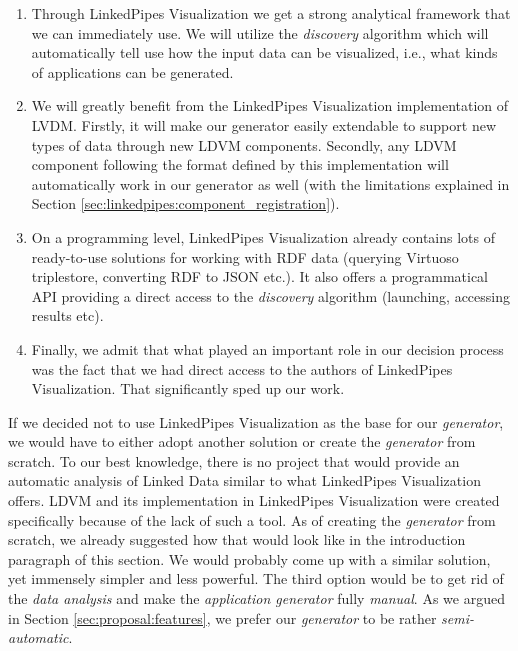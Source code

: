 \begin{enumerate}
\item Through LinkedPipes Visualization we get a strong analytical framework that we can immediately use. We will utilize the \emph{discovery} algorithm which will automatically tell use how the input data can be visualized, i.e., what kinds of applications can be generated.
\item We will greatly benefit from the LinkedPipes Visualization implementation of LVDM. Firstly, it will make our generator easily extendable to support new types of data through new LDVM components. Secondly, any LDVM component following the format defined by this implementation will automatically work in our generator as well (with the limitations explained in Section \ref{sec:linkedpipes:component_registration}).
\item On a programming level, LinkedPipes Visualization already contains lots of ready-to-use solutions for working with RDF data (querying Virtuoso triplestore, converting RDF to JSON etc.). It also offers a programmatical API providing a direct access to the \emph{discovery} algorithm (launching, accessing results etc).
\item Finally, we admit that what played an important role in our decision process was the fact that we had direct access to the authors of LinkedPipes Visualization. That significantly sped up our work.

\end{enumerate}
If we decided not to use LinkedPipes Visualization as the base for our \emph{generator}, we would have to either adopt another solution or create the \emph{generator} from scratch. To our best knowledge, there is no project that would provide an automatic analysis of Linked Data similar to what LinkedPipes Visualization offers. LDVM \cite{ldvm} and its implementation \cite{ldvm_use_cases} in LinkedPipes Visualization were created specifically because of the lack of such a tool. As of creating the \emph{generator} from scratch, we already suggested how that would look like in the introduction paragraph of this section. We would probably come up with a similar solution, yet immensely simpler and less powerful. The third option would be to get rid of the \emph{data analysis} and make the \emph{application generator} fully \emph{manual}. As we argued in Section \ref{sec:proposal:features}, we prefer our \emph{generator} to be rather \emph{semi-automatic}.

